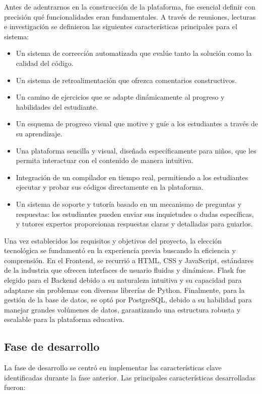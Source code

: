 Antes de adentrarnos en la construcción de la plataforma, fue esencial definir con precisión qué funcionalidades eran fundamentales. A través de reuniones, lecturas e investigación se definieron las siguientes características principales para el sistema:

\begin{itemize}
    \item Un sistema de corrección automatizada que evalúe tanto la solución como la calidad del código.
    \item Un sistema de retroalimentación que ofrezca comentarios constructivos.
    \item Un camino de ejercicios que se adapte dinámicamente al progreso y habilidades del estudiante.
    \item Un esquema de progreso visual que motive y guíe a los estudiantes a través de su aprendizaje.
    \item Una plataforma sencilla y visual, diseñada específicamente para niños, que les permita interactuar con el contenido de manera intuitiva.
    \item Integración de un compilador en tiempo real, permitiendo a los estudiantes ejecutar y probar sus códigos directamente en la plataforma.
    \item Un sistema de soporte y tutoría basado en un mecanismo de preguntas y respuestas: los estudiantes pueden enviar sus inquietudes o dudas específicas, y tutores expertos proporcionan respuestas claras y detalladas para guiarlos. 
\end{itemize}

Una vez establecidos los requisitos y objetivos del proyecto, la elección tecnológica se fundamentó en la experiencia previa buscando la eficiencia y comprensión. En el Frontend, se recurrió a HTML, CSS y JavaScript, estándares de la industria que ofrecen interfaces de usuario fluidas y dinámicas. Flask fue elegido para el Backend debido a su naturaleza intuitiva y su capacidad para adaptarse sin problemas con diversas librerías de Python. Finalmente, para la gestión de la base de datos, se optó por PostgreSQL, debido a su habilidad para manejar grandes volúmenes de datos, garantizando una estructura robusta y escalable para la plataforma educativa.

\subsection {Fase de desarrollo}

La fase de desarrollo se centró en implementar las características clave identificadas durante la fase anterior. Las principales características desarrolladas fueron:

